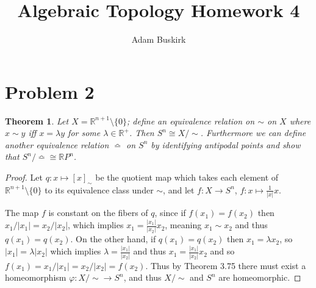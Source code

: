 \documentclass{article}
\title{Algebraic Topology Homework 4}
\author{Adam Buskirk}
\newtheorem{theorem}[subsection]{Theorem}
\theoremstyle{definition}
\newcommand{\R}{\mathbb{R}}
\begin{document}
\maketitle

\section{Problem 2}
\begin{theorem}
Let $X=\R^{n+1} \setminus \{0\}$; define an equivalence relation on 
$\sim$ on $X$ where $x \sim y$ iff $x=\lambda y$ for some $\lambda \in \R^+$.
Then $S^n \cong X/\sim$. Furthermore we can define another equivalence
relation $\bumpeq$ on $S^n$ by identifying antipodal points and show that
$S^n/\bumpeq \cong \R P^n$.
\end{theorem}
\begin{proof}
Let $q : x \mapsto [x]_\sim$ be the quotient map which takes each element of
$\R^{n+1} \setminus\{0\}$ to its equivalence class under $\sim$, and let 
$f : X \to S^n$, $f : x \mapsto \frac{1}{|x|} x$.
{\begin{center}
\end{center}}
The map $f$ is constant on the fibers of $q$, since if $f(x_1) = f(x_2)$ then
$x_1/|x_1|=x_2/|x_2|$, which implies $x_1 = \frac{|x_1|}{|x_2|} x_2$, meaning
$x_1 \sim x_2$ and thus $q(x_1) = q(x_2)$. On the other hand, if 
$q(x_1)=q(x_2)$ then $x_1=\lambda x_2$, so $|x_1|=\lambda |x_2|$ which
implies $\lambda = \frac{|x_1|}{|x_2|}$ and thus 
$x_1 = \frac{|x_1|}{|x_2|} x_2$ and so 
$f(x_1) = x_1/|x_1| = x_2 / |x_2| = f(x_2)$.
Thus by Theorem 3.75
there must exist a homeomorphism $\varphi : X/\sim \to S^n$, and thus
$X/\sim$ and $S^n$ are homeomorphic.


\end{proof}
\end{document}
